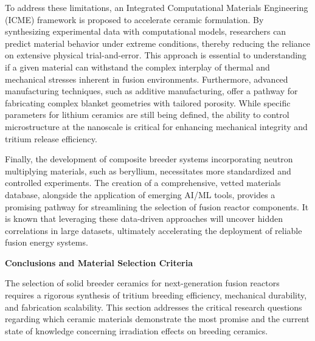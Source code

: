 \documentclass[review,12pt,a4paper]{elsarticle}
\begin{document}
\textcolor{medconf}{To address these limitations, an Integrated Computational Materials Engineering (ICME) framework is proposed to accelerate ceramic formulation. By synthesizing experimental data with computational models, researchers can predict material behavior under extreme conditions, thereby reducing the reliance on extensive physical trial-and-error. This approach is essential to understanding if a given material can withstand the complex interplay of thermal and mechanical stresses inherent in fusion environments. Furthermore, advanced manufacturing techniques, such as additive manufacturing, offer a pathway for fabricating complex blanket geometries with tailored porosity. While specific parameters for lithium ceramics are still being defined, the ability to control microstructure at the nanoscale is critical for enhancing mechanical integrity and tritium release efficiency.}

\textcolor{highconf}{Finally, the development of composite breeder systems incorporating neutron multiplying materials, such as beryllium, necessitates more standardized and controlled experiments. The creation of a comprehensive, vetted materials database, alongside the application of emerging AI/ML tools, provides a promising pathway for streamlining the selection of fusion reactor components. It is known that leveraging these data-driven approaches will uncover hidden correlations in large datasets, ultimately accelerating the deployment of reliable fusion energy systems.}

\textbf{Conclusions and Material Selection Criteria}

\textcolor{highconf}{The selection of solid breeder ceramics for next-generation fusion reactors requires a rigorous synthesis of tritium breeding efficiency, mechanical durability, and fabrication scalability. This section addresses the critical research questions regarding which ceramic materials demonstrate the most promise and the current state of knowledge concerning irradiation effects on breeding ceramics.}
\end{document}
